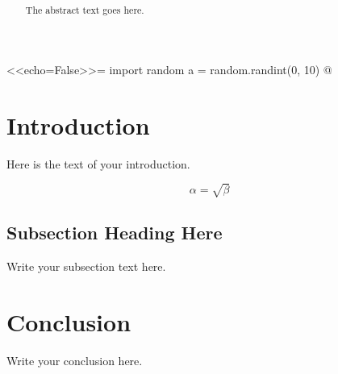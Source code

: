 \documentclass[12pt]{article}
\begin{document}
<<echo=False>>=
import random
a = random.randint(0, 10)
@

\title{ }
\author{ }

\maketitle

\begin{abstract}
The abstract text goes here.
\end{abstract}

\section{Introduction}
Here is the text of your introduction.

\begin{equation}
    \label{simple_equation}
    \alpha = \sqrt{ \beta }
\end{equation}

\subsection{Subsection Heading Here}
Write your subsection text here.

\section{Conclusion}
Write your conclusion here.

\end{document}
